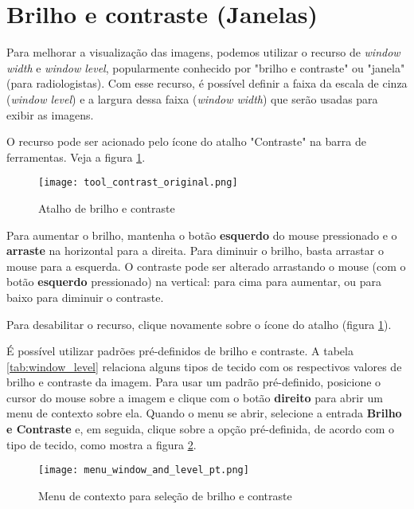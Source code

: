 \section{Brilho e contraste (Janelas)}
\label{sec:ww_wl}

Para melhorar a visualização das imagens, podemos utilizar o recurso de \textit{window width} e
\textit{window level}, popularmente conhecido por "brilho e contraste" ou "janela" (para radiologistas). 
Com esse recurso, é possível definir a faixa da escala de cinza (\textit{window level}) e a
largura dessa faixa (\textit{window width}) que serão usadas para exibir as imagens.

O recurso pode ser acionado pelo ícone do atalho "Contraste" na barra de ferramentas. Veja a figura \ref{fig:window_level_shortcut}.

\begin{figure}[!htb]
\centering
\texttt{[image: tool\_contrast\_original.png]}
\caption{Atalho de brilho e contraste}
\label{fig:window_level_shortcut}
\end{figure}

Para aumentar o brilho, mantenha o botão \textbf{esquerdo} do mouse pressionado e o \textbf{arraste} na 
horizontal para a direita. Para diminuir o brilho, basta arrastar o mouse para a esquerda. O contraste
pode ser alterado arrastando o mouse (com o botão \textbf{esquerdo} pressionado) na vertical: para cima
para aumentar, ou para baixo para diminuir o contraste.

Para desabilitar o recurso, clique novamente sobre o ícone do atalho (figura \ref{fig:window_level_shortcut}).

É possível utilizar padrões pré-definidos de brilho e contraste. A tabela \ref{tab:window_level} relaciona
alguns tipos de tecido com os respectivos valores de brilho e contraste da imagem. Para usar um padrão
pré-definido, posicione o cursor do mouse sobre a imagem e clique com o botão \textbf{direito} para abrir um
menu de contexto sobre ela. Quando o menu se abrir, selecione a entrada \textbf{Brilho e Contraste} e, em
seguida, clique sobre a opção pré-definida, de acordo com o tipo de tecido, como mostra a figura
\ref{fig:window_level}.


\begin{figure}[!htb]
\centering
\texttt{[image: menu\_window\_and\_level\_pt.png]}
\caption{Menu de contexto para seleção de brilho e contraste}
\label{fig:window_level}
\end{figure}

